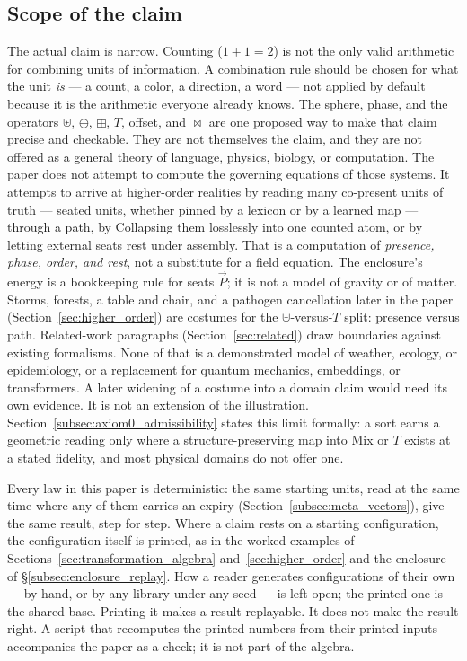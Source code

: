\documentclass[12pt, a4paper]{article}
\begin{document}
\subsection{Scope of the claim}
\label{subsec:claim_scope}
The actual claim is narrow. Counting ($1+1=2$) is not the only valid
arithmetic for combining units of information. A combination rule
should be chosen for what the unit \emph{is} --- a count, a color, a
direction, a word --- not applied by default because it is the
arithmetic everyone already knows. The sphere, phase, and the
operators $\uplus$, $\oplus$, $\boxplus$, $T$, offset, and $\bowtie$ are one
proposed way to make that claim precise and checkable. They are not
themselves the claim, and they are not offered as a general theory of
language, physics, biology, or computation.
The paper does not attempt to compute the governing equations of
those systems. It attempts to arrive at higher-order realities by
reading many co-present units of truth --- seated units, whether
pinned by a lexicon or by a learned map --- through a path, by
Collapsing them losslessly into one counted atom, or by letting
external seats rest under assembly. That is a computation of
\emph{presence, phase, order, and rest}, not a substitute for a field
equation. The enclosure's energy is a bookkeeping rule for seats
$\vec P$; it is not a model of gravity or of matter.
Storms, forests, a table and chair, and a pathogen cancellation later in the paper
(Section~\ref{sec:higher_order}) are costumes for the
$\uplus$-versus-$T$ split: presence versus path. Related-work
paragraphs (Section~\ref{sec:related}) draw boundaries against
existing formalisms. None of that is a demonstrated model of weather,
ecology, or epidemiology, or a replacement for quantum mechanics,
embeddings, or transformers. A later widening of a costume into a
domain claim would need its own evidence. It is not an extension of
the illustration.
Section~\ref{subsec:axiom0_admissibility} states this limit formally:
a sort earns a geometric reading only where a structure-preserving
map into Mix or $T$ exists at a stated fidelity, and most physical
domains do not offer one.

Every law in this paper is deterministic: the same starting units,
read at the same time where any of them carries an expiry
(Section~\ref{subsec:meta_vectors}), give the same result, step for
step. Where a claim rests on a
starting configuration, the configuration itself is printed, as in
the worked examples of Sections~\ref{sec:transformation_algebra}
and~\ref{sec:higher_order} and the enclosure of
\S\ref{subsec:enclosure_replay}. How a reader generates
configurations of their own --- by hand, or by any library under any
seed --- is left open; the printed one is the shared base. Printing it makes a result replayable. It does not make the result right. A script that recomputes the printed numbers from their printed inputs accompanies the paper as a check; it is not part of the algebra.
\end{document}

